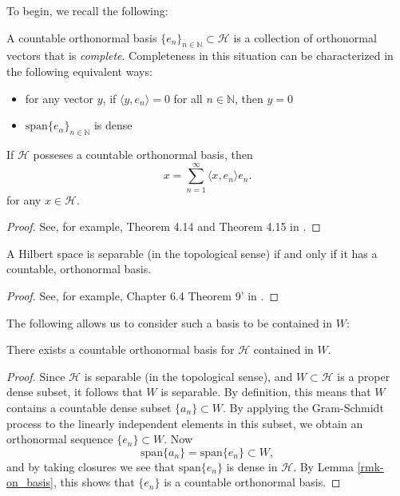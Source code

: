 \documentclass[12pt]{article}
\begin{document}
To begin, we recall the following:

\begin{lemma}[]
\label{rmk-on_basis}
A countable orthonormal basis $\{e_n\}_{n\in\mathbb{N}}\subset\mathcal{H}$ is a collection of orthonormal vectors that is \emph{complete}. Completeness in this situation can be characterized in the following equivalent ways:
	\begin{itemize}
		\item for any vector $y$, if $\langle y, e_n\rangle = 0$ for all $n\in\mathbb{N}$, then $y=0$
		\item $\text{span}\{e_\alpha\}_{n\in\mathbb{N}}$ is dense 
	\end{itemize}
	If $\mathcal{H}$ posseses a countable orthonormal basis, then  
	\begin{equation*}
		x=\sum_{n=1}^\infty\langle x, e_n\rangle e_n.
	\end{equation*}
	for any $x\in\mathcal{H}$. 
\end{lemma}
\begin{proof}
	See, for example, Theorem 4.14 and Theorem 4.15 in \cite{young_1988}.
\end{proof}

\begin{lemma}
	A Hilbert space is separable (in the topological sense) if and only if it has a countable, orthonormal basis.
\end{lemma}
\begin{proof}
	See, for example, Chapter 6.4 Theorem 9' in \cite{lax_2002}.
\end{proof}

The following allows us to consider such a basis to be contained in $W$:
\begin{proposition}
\label{prop_en_in_w}
	There exists a countable orthonormal basis for $\mathcal{H}$ contained in $W$.
\end{proposition}
\begin{proof}
	Since $\mathcal{H}$ is separable (in the topological sense), and $W\subset\mathcal{H}$ is a proper dense subset, it follows that $W$ is separable. By definition, this means that $W$ contains a countable dense subset $\{a_n\}\subset W$. By applying the Gram-Schmidt process to the linearly independent elements in this subset, we obtain an orthonormal sequence $\{e_n\}\subset W$. Now
	\begin{equation*}
		\text{span}\{a_n\} = \text{span}\{e_n\} \subset W,
	\end{equation*}
	and by taking closures we see that $\text{span}\{e_n\}$ is dense in $\mathcal{H}$. By Lemma \ref{rmk-on_basis}, this shows that $\{e_n\}$ is a countable orthonormal basis. 
\end{proof}
\end{document}
